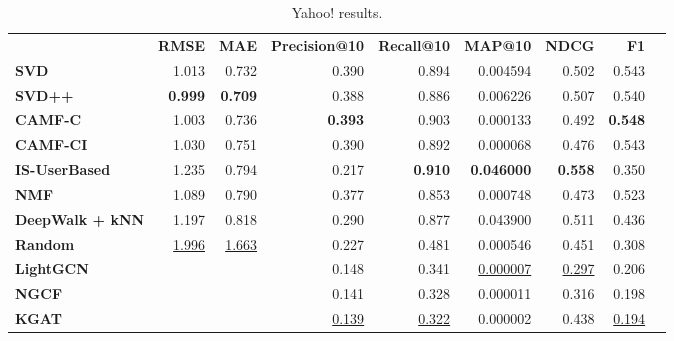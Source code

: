 \begin{table}[!htp]\centering
\caption{Yahoo! results.}\label{tab:yahootable}
\scriptsize
\begin{tabular}{lrrrrrrrr}\toprule
&\textbf{RMSE} &\textbf{MAE} &\textbf{Precision@10} &\textbf{Recall@10} &\textbf{MAP@10} &\textbf{NDCG} &\textbf{F1} \\\cmidrule{2-8}
\textbf{SVD} &1.013 &0.732 &0.390 &0.894 &0.004594 &0.502 &0.543 \\\cmidrule{1-8}
\textbf{SVD++} &\textbf{0.999} &\textbf{0.709} &0.388 &0.886 &0.006226 &0.507 &0.540 \\\cmidrule{1-8}
\textbf{CAMF-C} &1.003 &0.736 &\textbf{0.393} &0.903 &0.000133 &0.492 &\textbf{0.548} \\\cmidrule{1-8}
\textbf{CAMF-CI} &1.030 &0.751 &0.390 &0.892 &0.000068 &0.476 &0.543 \\\cmidrule{1-8}
\textbf{IS-UserBased} &1.235 &0.794 &0.217 &\textbf{0.910} &\textbf{0.046000} &\textbf{0.558} &0.350 \\\cmidrule{1-8}
\textbf{NMF} &1.089 &0.790 &0.377 &0.853 &0.000748 &0.473 &0.523 \\\cmidrule{1-8}
\textbf{DeepWalk + kNN} &1.197 &0.818 &0.290 &0.877 &0.043900 &0.511 &0.436 \\\cmidrule{1-8}
\textbf{Random} &\ul{1.996} &\ul{1.663} &0.227 &0.481 &0.000546 &0.451 &0.308 \\\cmidrule{1-8}
\textbf{LightGCN} & & &0.148 &0.341 &\ul{0.000007} &\ul{0.297} &0.206 \\\cmidrule{1-1}\cmidrule{1-8}
\textbf{NGCF} & & &0.141 &0.328 &0.000011 &0.316 &0.198 \\\midrule
\textbf{KGAT} & & &\ul{0.139} &\ul{0.322} &0.000002 &0.438 &\ul{0.194} \\
\bottomrule
\end{tabular}
\end{table}

